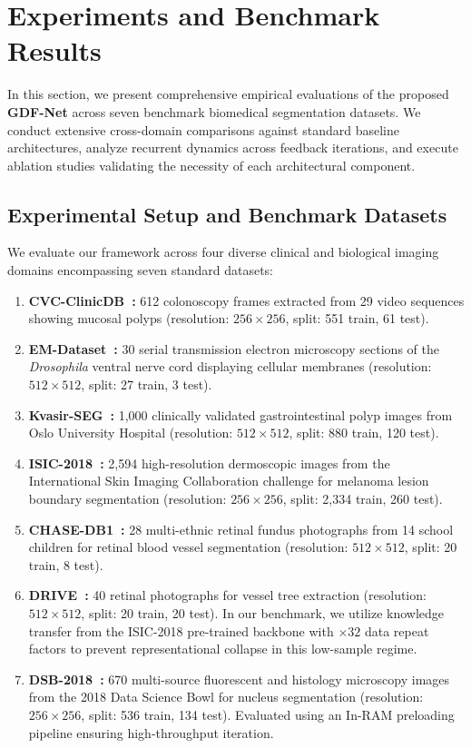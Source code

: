 \section{Experiments and Benchmark Results}
\label{sec:experiments}

In this section, we present comprehensive empirical evaluations of the proposed \textbf{GDF-Net} across seven benchmark biomedical segmentation datasets. We conduct extensive cross-domain comparisons against standard baseline architectures, analyze recurrent dynamics across feedback iterations, and execute ablation studies validating the necessity of each architectural component.

\subsection{Experimental Setup and Benchmark Datasets}
We evaluate our framework across four diverse clinical and biological imaging domains encompassing seven standard datasets:
\begin{enumerate}
  \item \textbf{CVC-ClinicDB~\cite{bernal2017comparative}:} 612 colonoscopy frames extracted from 29 video sequences showing mucosal polyps (resolution: $256 \times 256$, split: 551 train, 61 test).
  \item \textbf{EM-Dataset~\cite{cardona2010integrated}:} 30 serial transmission electron microscopy sections of the \textit{Drosophila} ventral nerve cord displaying cellular membranes (resolution: $512 \times 512$, split: 27 train, 3 test).
  \item \textbf{Kvasir-SEG~\cite{jha2020kvasir}:} 1{,}000 clinically validated gastrointestinal polyp images from Oslo University Hospital (resolution: $512 \times 512$, split: 880 train, 120 test).
  \item \textbf{ISIC-2018~\cite{codella2019skin}:} 2{,}594 high-resolution dermoscopic images from the International Skin Imaging Collaboration challenge for melanoma lesion boundary segmentation (resolution: $256 \times 256$, split: 2{,}334 train, 260 test).
  \item \textbf{CHASE-DB1~\cite{hoover2000locating}:} 28 multi-ethnic retinal fundus photographs from 14 school children for retinal blood vessel segmentation (resolution: $512 \times 512$, split: 20 train, 8 test).
  \item \textbf{DRIVE~\cite{staal2004ridge}:} 40 retinal photographs for vessel tree extraction (resolution: $512 \times 512$, split: 20 train, 20 test). In our benchmark, we utilize knowledge transfer from the ISIC-2018 pre-trained backbone with $\times 32$ data repeat factors to prevent representational collapse in this low-sample regime.
  \item \textbf{DSB-2018~\cite{caicedo2019nucleus}:} 670 multi-source fluorescent and histology microscopy images from the 2018 Data Science Bowl for nucleus segmentation (resolution: $256 \times 256$, split: 536 train, 134 test). Evaluated using an In-RAM preloading pipeline ensuring high-throughput iteration.
\end{enumerate}

